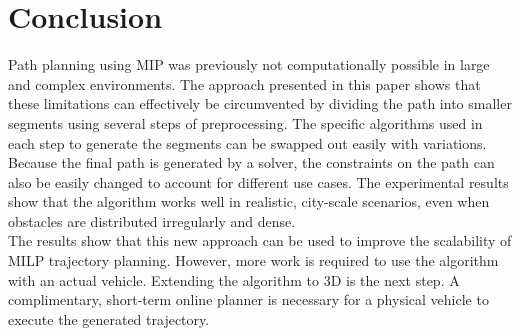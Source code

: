 \section{Conclusion}
Path planning using MIP was previously not computationally possible in large and complex environments. The approach presented in this paper shows that these limitations can effectively be circumvented by dividing the path into smaller segments using several steps of preprocessing. The specific algorithms used in each step to generate the segments can be swapped out easily with variations. Because the final path is generated by a solver, the constraints on the path can also be easily changed to account for different use cases. The experimental results show that the algorithm works well in realistic, city-scale scenarios, even when obstacles are distributed irregularly and dense.\\
The results show that this new approach can be used to improve the scalability of MILP trajectory planning. However, more work is required to use the algorithm with an actual vehicle.  Extending the algorithm to 3D is the next step. A complimentary, short-term online planner is necessary for a physical vehicle to execute the generated trajectory.